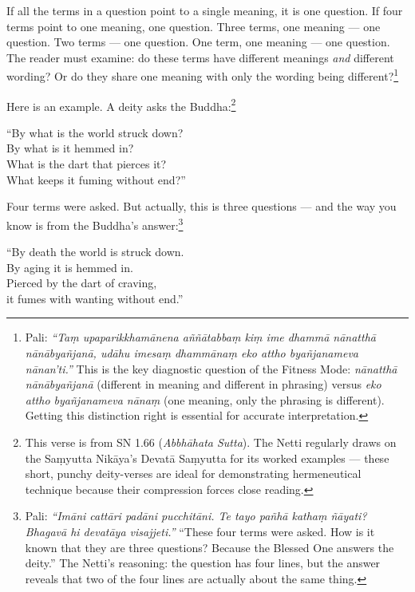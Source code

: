 If all the terms in a question point to a single meaning, it is one question. If four terms point to one meaning, one question. Three terms, one meaning --- one question. Two terms --- one question. One term, one meaning --- one question. The reader must examine: do these terms have different meanings \textit{and} different wording? Or do they share one meaning with only the wording being different?\footnote{Pali: \textit{``Taṃ upaparikkhamānena aññātabbaṃ kiṃ ime dhammā nānatthā nānābyañjanā, udāhu imesaṃ dhammānaṃ eko attho byañjanameva nānan'ti.''} This is the key diagnostic question of the Fitness Mode: \textit{nānatthā nānābyañjanā} (different in meaning and different in phrasing) versus \textit{eko attho byañjanameva nānaṃ} (one meaning, only the phrasing is different). Getting this distinction right is essential for accurate interpretation.}

Here is an example. A deity asks the Buddha:\footnote{This verse is from SN 1.66 (\textit{Abbhāhata Sutta}). The Netti regularly draws on the Saṃyutta Nikāya's Devatā Saṃyutta for its worked examples --- these short, punchy deity-verses are ideal for demonstrating hermeneutical technique because their compression forces close reading.}

\begin{versebox}
``By what is the world struck down?\\
By what is it hemmed in?\\
What is the dart that pierces it?\\
What keeps it fuming without end?''
\end{versebox}

Four terms were asked. But actually, this is three questions --- and the way you know is from the Buddha's answer:\footnote{Pali: \textit{``Imāni cattāri padāni pucchitāni. Te tayo pañhā kathaṃ ñāyati? Bhagavā hi devatāya visajjeti.''} ``These four terms were asked. How is it known that they are three questions? Because the Blessed One answers the deity.'' The Netti's reasoning: the question has four lines, but the answer reveals that two of the four lines are actually about the same thing.}

\begin{versebox}
``By death the world is struck down.\\
By aging it is hemmed in.\\
Pierced by the dart of craving,\\
it fumes with wanting without end.''
\end{versebox}

